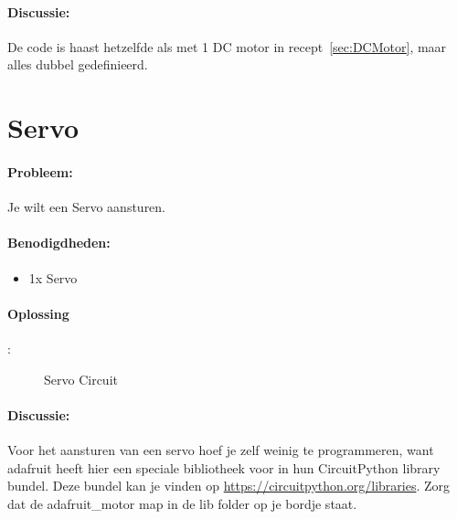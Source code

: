	\paragraph{Discussie:} De code is haast hetzelfde als met 1 DC motor in recept~\ref{sec:DCMotor}, maar alles dubbel gedefinieerd. 
	
\newpage
\section{Servo}\label{sec:servo}
\paragraph{Probleem:} Je wilt een Servo aansturen.

\paragraph{Benodigdheden:}
\begin{itemize}
	\item 1x Servo
\end{itemize}

\paragraph{Oplossing}:

\begin{figure}[H]
	\caption{Servo Circuit}
	\label{fig:Servo}
\end{figure}

\newpage

\paragraph{Discussie:} Voor het aansturen van een servo hoef je zelf weinig te programmeren, want adafruit heeft hier een speciale bibliotheek voor in hun CircuitPython library bundel. Deze bundel kan je vinden op \url{https://circuitpython.org/libraries}. Zorg dat de adafruit\_motor map in de lib folder op je bordje staat. \\


